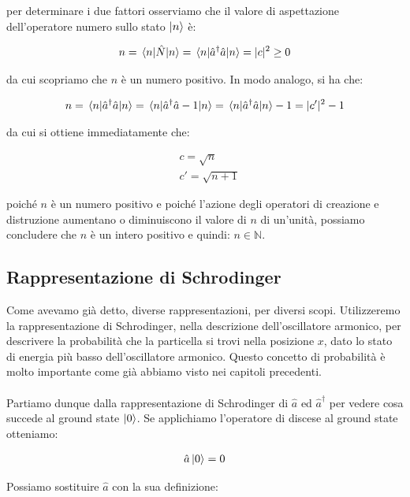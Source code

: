	per determinare i due fattori osserviamo che il valore di aspettazione dell'operatore numero sullo stato $\ket{n}$ è:
	
\begin{align*}
	n = \mel{n}{\hat{N}}{n} = \mel{n}{\hat{a}^{\dagger}\hat{a}}{n} = |c|^2 \geq 0
\end{align*} 

	da cui scopriamo che $n$ è un numero positivo. In modo analogo, si ha che:
	
\begin{align*}
	n = \mel{n}{\hat{a}^{\dagger}\hat{a}}{n} = \mel{n}{\hat{a}^{\dagger}\hat{a} -1 }{n} = \mel{n}{\hat{a}^{\dagger}\hat{a}}{n} - 1 = |c'|^2 -1
\end{align*}

	da cui si ottiene immediatamente che:
	
\begin{align*}
	& c = \sqrt{n}\\
	& c' = \sqrt{n+1}
\end{align*}

	poiché $n$ è un numero positivo e poiché l'azione degli operatori di creazione e distruzione aumentano o diminuiscono il valore di $n$ di un'unità, possiamo concludere che $n$ è un intero positivo e quindi: $n \in \mathbb{N}$.
	
\subsection{Rappresentazione di Schrodinger}

	Come avevamo già detto, diverse rappresentazioni, per diversi scopi. Utilizzeremo la rappresentazione di Schrodinger, nella descrizione dell'oscillatore armonico, per descrivere la probabilità che la particella si trovi nella posizione $x$, dato lo stato di energia più basso dell'oscillatore armonico. Questo concetto di probabilità è molto importante come già abbiamo visto nei capitoli precedenti.
	\\
	\\
	Partiamo dunque dalla rappresentazione di Schrodinger di $\hat{a}$ ed $\hat{a}^{\dagger}$ per vedere cosa succede al ground state $\ket{0}$. Se applichiamo l'operatore di discese al ground state otteniamo:
	
\begin{align*}
	\hat{a}\ket{0} = 0
\end{align*}

	Possiamo sostituire $\hat{a}$ con la sua definizione:
	
